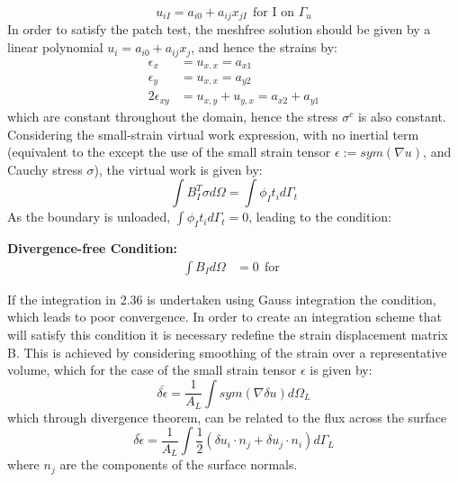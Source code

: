 \begin{equation}
u_{iI} = a_{i0} + a_{ij}x_{jI} ~~ \text{for I on } \Gamma_u
\end{equation}
In order to satisfy the patch test, the meshfree solution should be given by a linear polynomial $u_i = a_{i0} + a_{ij}x_j$, and hence the strains by:
\begin{align*}
\epsilon_x &= u_{x,x} = a_{x1} \\
\epsilon_y &= u_{x,x} = a_{y2} \\
2\epsilon_{xy} &= u_{x,y} + u_{y,x} = a_{x2} + a_{y1} 
\end{align*}
which are constant throughout the domain, hence the stress $\sigma^c$ is also constant. Considering the small-strain virtual work expression, with no inertial term (equivalent to the except the use of the small strain tensor $\epsilon := sym(\nabla u)$, and Cauchy stress $\sigma$), the virtual work is given by:
\begin{equation}
\int {B_I^T {\sigma} d \Omega }  = \int{\phi_I t_i d \Gamma_t}
\end{equation}
As the boundary is unloaded, $\int \phi_I t_i d\Gamma_t = 0$, leading to the condition:

\begin{tcolorbox}
\textbf{	Divergence-free Condition:}
\begin{align*}
\int {B_I d\Omega } &= 0 ~~ \text{for}~~ 
\end{align*}
\end{tcolorbox}
If the integration in 2.36 is undertaken using Gauss integration the condition, which leads to poor convergence. In order to create an integration scheme that will satisfy this condition it is necessary redefine the strain displacement matrix B. This is achieved by considering smoothing of the strain over a representative volume, which for the case of the small strain tensor $\epsilon$ is given by:
\begin{equation}
\bar{\delta \epsilon} = \frac{1}{A_L} \int { sym(\nabla \delta u) } d\Omega_L
\end{equation}
which through divergence theorem, can be related to the flux across the surface
\begin{equation}
\bar{\delta \epsilon} = \frac{1}{A_L} \int {\frac{1}{2}(\delta u_i \cdot n_j + \delta u_j \cdot n_i) d\Gamma_L}
\end{equation}
where $n_j$ are the components of the surface normals.

